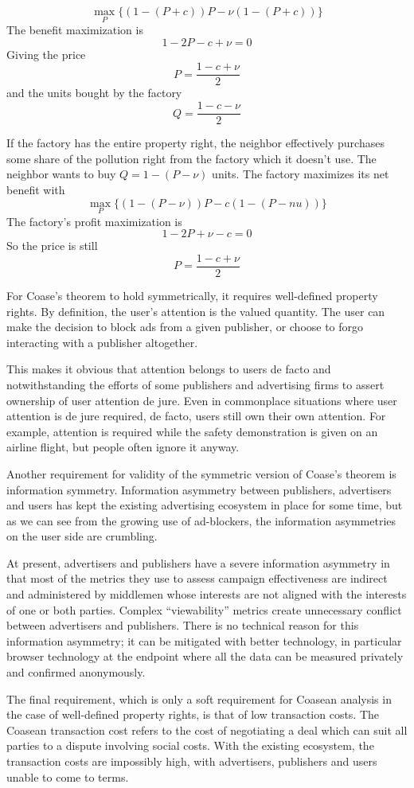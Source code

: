 \documentclass[11pt]{article}
\begin{document}
\[ \max_{P} \{ (1-(P+c))P - \nu(1-(P+c)) \} \]
The benefit maximization is \[1-2P -c + \nu = 0\]
Giving the price \[P =\frac{1-c+\nu}{2} \] and the units bought by the factory 
\[Q=\frac{1-c-\nu}{2} \]

   If the factory has the entire property right, the neighbor effectively purchases some share of the pollution right from the factory which it doesn't use. The neighbor wants to buy $Q=1-(P-\nu)$ units. The factory maximizes its net benefit with
   \[ \max_{P} \{ (1-(P-\nu))P - c(1-(P -nu)) \}  \]
   The factory's profit maximization is
   \[ 1-2P + \nu -c = 0\]
   So the price is still \[P=\frac{1-c+\nu}{2} \]

For Coase’s theorem to hold symmetrically, it requires well-defined
property rights. By definition, the user’s attention is the valued
quantity. The user can make the decision to block ads from a given
publisher, or choose to forgo interacting with a publisher altogether.

This makes it obvious that attention belongs to users de facto and
notwithstanding the efforts of some publishers and advertising firms
to assert ownership of user attention de jure. Even in commonplace
situations where user attention is de jure required, de facto, users
still own their own attention. For example, attention is required
while the safety demonstration is given on an airline flight, but
people often ignore it anyway.

Another requirement for validity of the symmetric version of Coase’s
theorem is information symmetry. Information asymmetry between
publishers, advertisers and users has kept the existing advertising
ecosystem in place for some time, but as we can see from the growing
use of ad-blockers, the information asymmetries on the user side are
crumbling. 

At present, advertisers and publishers have a severe information
asymmetry in that most of the metrics they use to assess campaign
effectiveness are indirect and administered by middlemen whose
interests are not aligned with the interests of one or both
parties. Complex “viewability” metrics create unnecessary conflict
between advertisers and publishers. There is no technical reason for
this information asymmetry; it can be mitigated with better
technology, in particular browser technology at the endpoint where all
the data can be measured privately and confirmed anonymously.

The final requirement, which is only a soft requirement for Coasean
analysis in the case of well-defined property rights, is that of low
transaction costs. The Coasean transaction cost refers to the cost of
negotiating a deal which can suit all parties to a dispute involving
social costs. With the existing ecosystem, the transaction costs are
impossibly high, with advertisers, publishers and users unable to come
to terms. 
\end{document}
